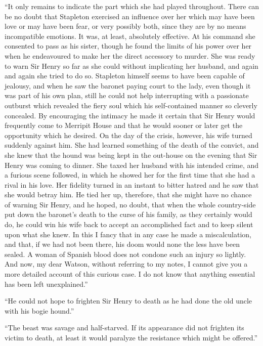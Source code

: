 \documentclass[paper=5.5in:8.5in,BCOR=7mm,twoside,DIV=calc,12pt,usegeometry,openany,chapterprefix,endperiod]{scrbook} %
\begin{document}
\enquote{It only remains to indicate the part which she had played \newline throughout. There can be no doubt that Stapleton exercised an influence over her which may have been love or may have been fear, or very possibly both, since they are by no means incompatible emotions. It was, at least, absolutely effective. At his command she consented to pass as his sister, though he found the limits of his power over her when he endeavoured to make her the direct accessory to murder. She was ready to warn Sir Henry so far as she could without implicating her husband, and again and again she tried to do so. Stapleton himself seems to have been capable of jealousy, and when he saw the baronet paying court to the lady, even though it was part of his own plan, still he could not help interrupting with a passionate outburst which revealed the fiery soul which his self-contained manner so cleverly concealed. By encouraging the intimacy he made it certain that Sir Henry would frequently come to Merripit House and that he would sooner or later get the opportunity which he desired. On the day of the crisis, however, his wife turned suddenly against him. She had learned something of the death of the convict, and she knew that the hound was being kept in the out-house on the evening that Sir Henry was coming to dinner. She taxed her husband with his intended crime, and a furious scene followed, in which he showed her for the first time that she had a rival in his love. Her fidelity turned in an instant to bitter hatred and he saw that she would betray him. He tied her up, therefore, that she might have no chance of warning Sir Henry, and he hoped, no doubt, that when the whole country-side put down the baronet's death to the curse of his family, as they certainly would do, he could win his wife back to accept an accomplished fact and to keep silent upon what she knew. In this I fancy that in any case he made a miscalculation, and that, if we had not been there, his doom would none the less have been sealed. A woman of Spanish blood does not condone such an injury so lightly. And now, my dear Watson, without referring to my notes, I cannot give you a more detailed account of this curious case. I do not know that anything essential has been left unexplained.}

\enquote{He could not hope to frighten Sir Henry to death as he had done the old uncle with his bogie hound.}

\enquote{The beast was savage and half-starved. If its appearance did not frighten its victim to death, at least it would paralyze the resistance which might be offered.}
\end{document}
